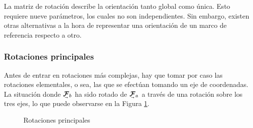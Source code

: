 La matriz de rotación describe la orientación tanto global como única. Esto requiere nueve parámetros, los cuales no son independientes. Sin embargo, existen otras alternativas a la hora de representar una orientación de un marco de referencia respecto a otro.

\subsubsection{Rotaciones principales}
Antes de entrar en rotaciones más complejas, hay que tomar por caso las rotaciones elementales, o sea, las que se efectúan tomando un eje de coordenadas. La situación donde $\undervec{\bm{\mathcal{F}}}_b$ ha sido rotado de $\undervec{\bm{\mathcal{F}}}_a$ a través de una rotación sobre los tres ejes, lo que puede observarse en la Figura \ref{fig:rotations}.

\begin{figure}[!h]
    \centering
    \hfill
    \hfill
    \caption{Rotaciones principales}
    \label{fig:rotations}
\end{figure}

